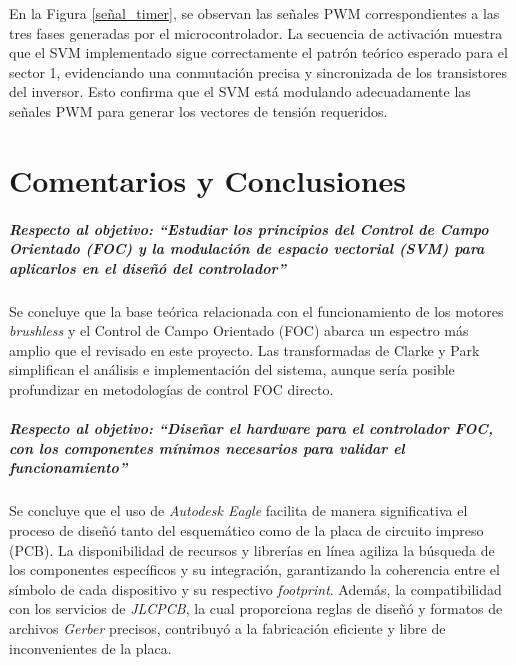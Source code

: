 \documentclass[11pt]{report}
\begin{document}
En la Figura \ref{señal_timer}, se observan las señales PWM correspondientes a las tres fases generadas por el microcontrolador. La secuencia de activación muestra que el SVM implementado sigue correctamente el patrón teórico esperado para el sector 1, evidenciando una conmutación precisa y sincronizada de los transistores del inversor. Esto confirma que el SVM está modulando adecuadamente las señales PWM para generar los vectores de tensión requeridos.

\newpage
\chapter*{Comentarios y Conclusiones}

\paragraph{Respecto al objetivo: ``Estudiar los principios del Control de Campo Orientado (FOC) y la modulación de espacio vectorial (SVM) para aplicarlos en el diseñó del controlador''} Se concluye que la base teórica relacionada con el funcionamiento de los motores \textit{brushless} y el Control de Campo Orientado (FOC) abarca un espectro más amplio que el revisado en este proyecto. Las transformadas de Clarke y Park simplifican el análisis e implementación del sistema, aunque sería posible profundizar en metodologías de control FOC directo.

\paragraph{Respecto al objetivo: ``Diseñar el hardware para el controlador FOC, con los componentes mínimos necesarios para validar el funcionamiento''} Se concluye que el uso de \emph{Autodesk Eagle} facilita de manera significativa el proceso de diseñó tanto del esquemático como de la placa de circuito impreso (PCB). La disponibilidad de recursos y librerías en línea agiliza la búsqueda de los componentes específicos y su integración, garantizando la coherencia entre el símbolo de cada dispositivo y su respectivo \emph{footprint}. Además, la compatibilidad con los servicios de \emph{JLCPCB}, la cual proporciona reglas de diseñó y formatos de archivos \emph{Gerber} precisos, contribuyó a la fabricación eficiente y libre de inconvenientes de la placa.
\end{document}
